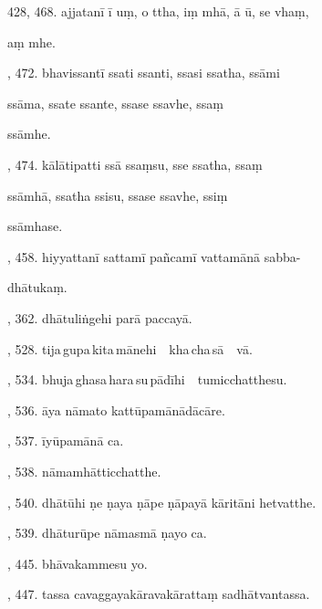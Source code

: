 428, 468. ajjatanī ī uṃ, o ttha, iṃ mhā, ā ū, se vhaṃ,\par \noindent
\hspace{15mm} aṃ mhe.\hfill \pageref{sut:428}\par {}, 472. bhavissantī ssati ssanti, ssasi ssatha, ssāmi\par \noindent
\hspace{15mm} ssāma, ssate ssante, ssase ssavhe, ssaṃ\par \noindent
\hspace{15mm} ssāmhe.\hfill \pageref{sut:429}\par {}, 474. kālātipatti ssā ssaṃsu, sse ssatha, ssaṃ\par \noindent
\hspace{15mm} ssāmhā, ssatha ssisu, ssase ssavhe, ssiṃ\par \noindent
\hspace{15mm} ssāmhase.\hfill \pageref{sut:430}\par {}, 458. hiyyattanī sattamī pañcamī vattamānā sabba-\par \noindent
\hspace{15mm} dhātukaṃ.\hfill \pageref{sut:431}\par {}, 362. dhātuliṅgehi parā paccayā.\hfill \pageref{sut:432}\par {}, 528. tija\,gupa\,kita\,mānehi\ \ kha\,cha\,sā\ \ vā.\hfill \pageref{sut:433}\par {}, 534. bhuja\,ghasa\,hara\,su\,pādīhi\ \ tumicchatthesu.\hfill \pageref{sut:434}\par {}, 536. āya nāmato kattūpamānādācāre.\hfill \pageref{sut:435}\par {}, 537. īyūpamānā ca.\hfill \pageref{sut:436}\par {}, 538. nāmamhātticchatthe.\hfill \pageref{sut:437}\par {}, 540. dhātūhi ṇe ṇaya ṇāpe ṇāpayā kāritāni hetvatthe.\par \noindent
\hspace{15mm}\hfill \pageref{sut:438}\par {}, 539. dhāturūpe nāmasmā ṇayo ca.\hfill \pageref{sut:439}\par {}, 445. bhāvakammesu yo.\hfill \pageref{sut:440}\par {}, 447. tassa cavaggayakāravakārattaṃ sadhātvantassa.\par \noindent
\hspace{15mm}\hfill \pageref{sut:441}\par \noindent

